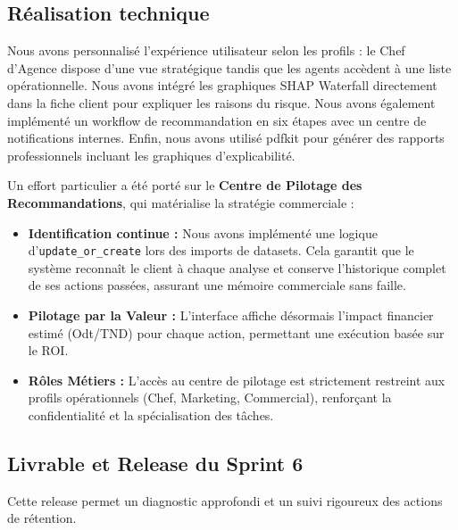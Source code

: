 \subsection{Réalisation technique}

Nous avons personnalisé l'expérience utilisateur selon les profils : le Chef d'Agence dispose d'une vue stratégique tandis que les agents accèdent à une liste opérationnelle. Nous avons intégré les graphiques SHAP Waterfall directement dans la fiche client pour expliquer les raisons du risque. Nous avons également implémenté un workflow de recommandation en six étapes avec un centre de notifications internes. Enfin, nous avons utilisé pdfkit pour générer des rapports professionnels incluant les graphiques d'explicabilité.

Un effort particulier a été porté sur le \textbf{Centre de Pilotage des Recommandations}, qui matérialise la stratégie commerciale :
\begin{itemize}
    \item \textbf{Identification continue :} Nous avons implémenté une logique d'\texttt{update\_or\_create} lors des imports de datasets. Cela garantit que le système reconnaît le client à chaque analyse et conserve l'historique complet de ses actions passées, assurant une mémoire commerciale sans faille.
    \item \textbf{Pilotage par la Valeur :} L'interface affiche désormais l'impact financier estimé (Odt/TND) pour chaque action, permettant une exécution basée sur le ROI.
    \item \textbf{Rôles Métiers :} L'accès au centre de pilotage est strictement restreint aux profils opérationnels (Chef, Marketing, Commercial), renforçant la confidentialité et la spécialisation des tâches.
\end{itemize}

\subsection{Livrable et Release du Sprint 6}

Cette release  permet un diagnostic approfondi et un suivi rigoureux des actions de rétention.
